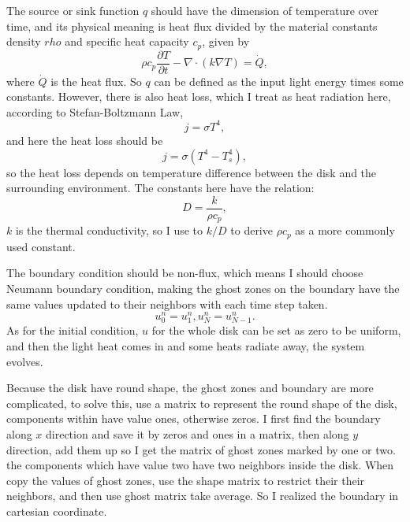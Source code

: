 \documentclass[a4paper,11pt]{article}
\theoremstyle{mytheor}
\begin{document}
The source or sink function $q$ should have the dimension of temperature over time, and its physical meaning is heat flux divided by the material constants density $rho$ and specific heat capacity $c_p$, given by
\begin{equation}
\rho c_p \frac{\partial T}{\partial t} - \nabla \cdot (k \nabla T) = \dot Q,
\end{equation}
where $\dot Q$ is the heat flux. So $q$ can be defined as the input light energy times some constants. However, there is also heat loss, which I treat as heat radiation here, according to Stefan-Boltzmann Law, 
\begin{equation}
j = \sigma T^4,
\end{equation}
and here the heat loss should be
\begin{equation}
j = \sigma (T^4 - T_{s}^4),
\end{equation}
so the heat loss depends on temperature difference between the disk and the surrounding environment. The constants here have the relation:
\begin{equation}
D = \frac{k}{\rho c_p},
\end{equation}
$k$ is the thermal conductivity, so I use to $k/D$ to derive $\rho c_p$ as a more commonly used constant. 

The boundary condition should be non-flux, which means I should choose Neumann boundary condition, making the ghost zones on the boundary have the same values updated to their neighbors with each time step taken. 
\begin{equation}
u_{0}^{n} = u_{1}^{n}, u_{N}^{n} = u_{N-1}^{n}.
\end{equation}
As for the initial condition, $u$ for the whole disk can be set as zero to be uniform, and then the light heat comes in and some heats radiate away, the system evolves. 

Because the disk have round shape, the ghost zones and boundary are more complicated, to solve this, use a matrix to represent the round shape of the disk, components within have value ones, otherwise zeros. I first find the boundary along $x$ direction and save it by zeros and ones in a matrix, then along $y$ direction, add them up so I get the matrix of ghost zones marked by one or two. the components which have value two have two neighbors inside the disk. When copy the values of ghost zones, use the shape matrix to restrict their their neighbors, and then use ghost matrix take average. So I realized the boundary in cartesian coordinate.
\end{document}
